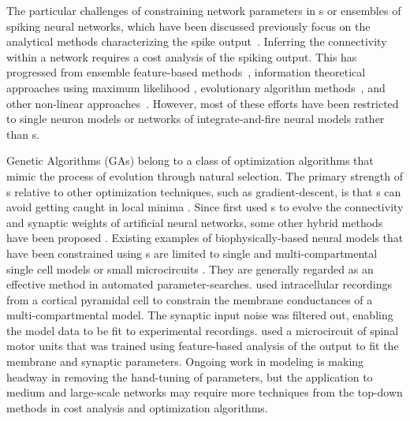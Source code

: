 \smallskip{} 

The particular challenges of constraining network parameters in {\BNN}s
or ensembles of spiking neural networks, which have been discussed
previously \citep{EggertHemmen:2001,Brette:2007} focus on the
analytical methods characterizing the spike output~\citep{Victor:2005,KostalLanskyEtAl:2007,BrownKassEtAl:2004}. Inferring
the connectivity within a network requires a cost analysis of the
spiking output.  This has progressed from ensemble feature-based
methods~\citep{SameshimaBaccala:1999,DahlhausEichlerEtAl:1997,TheunissenSenEtAl:2000},
information theoretical approaches using maximum likelihood
\citep{YamadaMatsumotoEtAl:1996,Chichilnisky:2001,OkatanWilsonEtAl:2005,PaninskiPillowEtAl:2004},
evolutionary algorithm methods~\citep{TakahamaSakai:2005,Yao:1999},
and other non-linear approaches~\citep{Eblen-ZajjurSalasEtAl:1999}.
However, most of these efforts have been restricted to single neuron
models or networks of integrate-and-fire neural models rather than
{\BNN}s.

\smallskip{} 

Genetic Algorithms (GAs) belong to a class of optimization algorithms
that mimic the process of evolution through natural selection. The
primary strength of {\GA}s relative to other optimization techniques,
such as gradient-descent, is that {\GA}s can avoid getting caught in
local minima \citep{Goldberg:1989,Whitley:1995}. Since
\citet{Holland:1975} first used {\GA}s to evolve the connectivity and
synaptic weights of artificial neural networks, some other hybrid
methods have been proposed \citep{Yao:1999,Whitley:1995}. Existing
examples of biophysically-based neural models that have been
constrained using {\GA}s are limited to single and multi-compartmental
single cell models \citep{KerenPeledEtAl:2005,VanierBower:1999,VanDeEtAl:2008} or small
microcircuits \citep{TaylorEnoka:2004}.  They are generally regarded
as an effective method in automated
parameter-searches. \citet{KerenPeledEtAl:2005} used intracellular
recordings from a cortical pyramidal cell to constrain the membrane
conductances of a multi-compartmental model.  The synaptic input noise
was filtered out, enabling the model data to be fit to experimental
recordings. \citet{TaylorEnoka:2004} used a microcircuit of spinal
motor units that was trained using feature-based analysis of the
output to fit the membrane and synaptic parameters.  Ongoing work in
{\BNN} modeling \citep{VanierBower:1999,VanDeEtAl:2008} is making headway
in removing the hand-tuning of parameters, but the application to
medium and large-scale networks may require more techniques from the
top-down methods in cost analysis and optimization algorithms.

